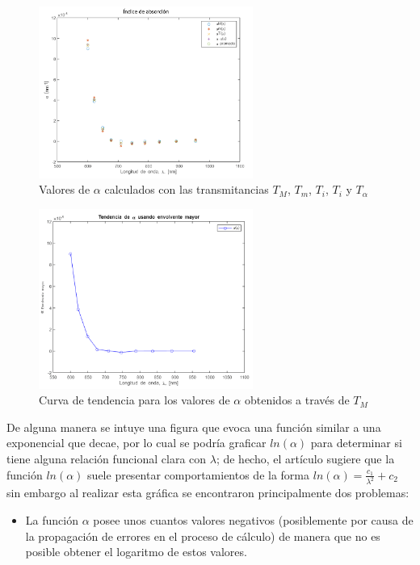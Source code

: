 \documentclass[article]{article}
\begin{document}
\begin{multicols}{2}
        \begin{figure}[H]
        \centering
        \includegraphics[width=7cm]{valores-alpha.png}
        \caption{Valores de $\alpha$ calculados con las transmitancias $T_M$, $T_m$, $T_i$, $T_i$ y $T_{\alpha}$}
        \label{fig: valores alpha}
        \end{figure}
        
        \begin{figure}[H]
        \centering
        \includegraphics[width=7cm]{alpha T_M.png}
        \caption{Curva de tendencia para los valores de $\alpha$ obtenidos a través de $T_M$}
        \label{fig: alpha T_M}
        \end{figure}
        
        De alguna manera se intuye una figura que evoca una función similar a una exponencial que decae, por lo cual se podría graficar $ln(\alpha)$ para determinar si tiene alguna relación funcional clara con $\lambda$; de hecho, el artículo sugiere que la función $ln(\alpha)$ suele presentar comportamientos de la forma $ln(\alpha)=\frac{c_1}{\lambda^2}+c_2$ sin embargo al realizar esta gráfica se encontraron principalmente dos problemas:
        
        \begin{itemize}
            \item La función $\alpha$ posee unos cuantos valores negativos (posiblemente por causa de la propagación de errores en el proceso de cálculo) de manera que no es posible obtener el logaritmo de estos valores.
            

\end{itemize}
\end{multicols}
\end{document}

